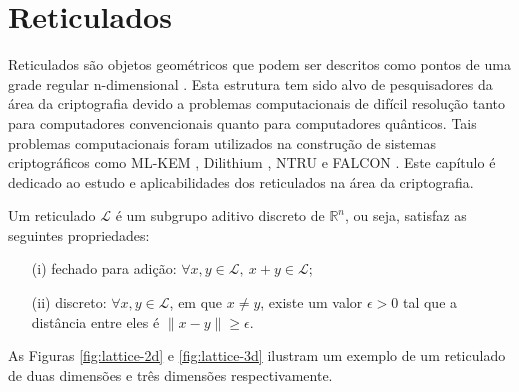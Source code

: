 \chapter{Reticulados}
\label{cap:reticulados}

    Reticulados são objetos geométricos que podem ser descritos como pontos de uma grade regular n-dimensional \cite{daniele-lattices}. Esta estrutura tem sido alvo de pesquisadores da área da criptografia devido a problemas computacionais de difícil resolução tanto para computadores convencionais quanto para computadores quânticos. Tais problemas computacionais foram utilizados na construção de sistemas criptográficos como \ac{ML-KEM} \cite{kyber}, Dilithium \cite{dilithium}, NTRU \cite{ntru} e FALCON \cite{falcon}. Este capítulo é dedicado ao estudo e aplicabilidades dos reticulados na área da criptografia.

\begin{definition}[reticulado]
    Um reticulado $\mathcal{L}$ é um subgrupo aditivo discreto de $\mathbb{R}^{n}$, ou seja, satisfaz as seguintes propriedades:

    \begin{itemize}
        \item[(i)] fechado para adição: $\forall x,y \in \mathcal{L},\ x+y \in \mathcal{L}$;
        \item[(ii)] discreto: $\forall x,y \in \mathcal{L}$, em que $x \neq y$, existe um valor $\epsilon > 0$ tal que a distância entre eles é $\lVert x-y \rVert \ge \epsilon$.
    \end{itemize}
\end{definition}

    As Figuras \ref{fig:lattice-2d} e \ref{fig:lattice-3d} ilustram um exemplo de um reticulado de duas dimensões e três dimensões respectivamente.
    
